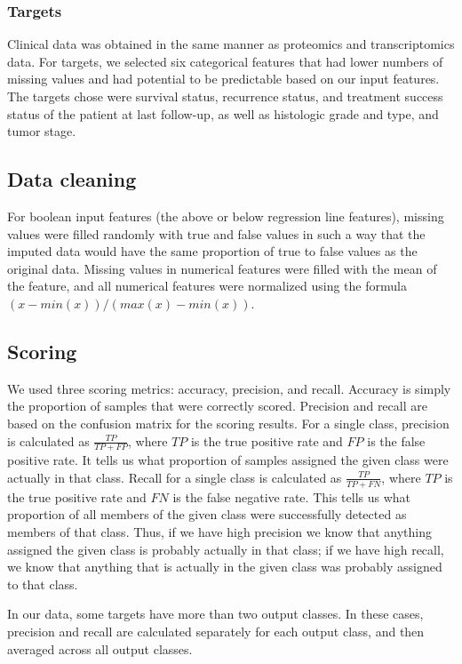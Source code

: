 \documentclass{article}
\begin{document}
\subsubsection{Targets}

Clinical data was obtained in the same manner as proteomics and transcriptomics data. For targets, we selected six categorical features that had lower numbers of missing values and had potential to be predictable based on our input features. The targets chose were survival status, recurrence status, and treatment success status of the patient at last follow-up, as well as histologic grade and type, and tumor stage.

\subsection{Data cleaning}

For boolean input features (the above or below regression line features), missing values were filled randomly with true and false values in such a way that the imputed data would have the same proportion of true to false values as the original data. Missing values in numerical features were filled with the mean of the feature, and all numerical features were normalized using the formula $(x - min(x)) / (max(x) - min(x))$.

\subsection{Scoring}

We used three scoring metrics: accuracy, precision, and recall. Accuracy is simply the proportion of samples that were correctly scored. Precision and recall are based on the confusion matrix for the scoring results. For a single class, precision is calculated as $\frac{TP}{TP + FP}$, where $TP$ is the true positive rate and $FP$ is the false positive rate. It tells us what proportion of samples assigned the given class were actually in that class. Recall for a single class is calculated as $\frac{TP}{TP + FN}$, where $TP$ is the true positive rate and $FN$ is the false negative rate. This tells us what proportion of all members of the given class were successfully detected as members of that class. Thus, if we have high precision we know that anything assigned the given class is probably actually in that class; if we have high recall, we know that anything that is actually in the given class was probably assigned to that class.

In our data, some targets have more than two output classes. In these cases, precision and recall are calculated separately for each output class, and then averaged across all output classes.
\end{document}
